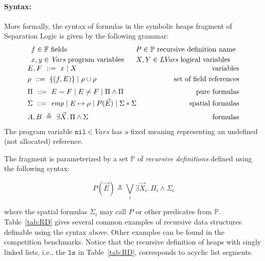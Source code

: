 \documentclass[twoside,11pt]{article}
\newcommand{\sep}{.\,}
\newcommand{\posep}{*}
\newcommand{\points}{\mapsto}
\newcommand{\vars}{\mathit{Vars}}
\newcommand{\lvars}{\mathit{LVars}}
\newcommand{\pfields}{\mathbb{F}}
\newcommand{\preds}{\mathbb{P}}
\newcommand{\nil}{\mathtt{nil}}
\newcommand{\ls}{\mathtt{ls}}
\begin{document}
\paragraph{Syntax:}
More formally, the syntax of formulas in the symbolic heaps fragment of Separation Logic
is given by the following grammar:
$$
\begin{array}{c}
\begin{array}{ll}
f \in \pfields \mbox{ fields} ~&~
P \in \preds \mbox{ recursive definition name}
\\[0.8mm]
x,y \in \vars \mbox{ program variables} ~&~
X,Y \in \lvars \mbox{ logical variables}
\end{array}
\\[2mm]
%
%
E,F\ ::=\ x \mid X 
\hfill \mbox{variables}
\\[1mm]
\rho\ ::=\ \{ (f,E) \} \mid \rho\cup\rho 
\hfill \mbox{set of field references}
\\[2mm]
%
\Pi\ ::=\ E = F \mid E \neq F \mid \Pi \land \Pi \hfill 
\mbox{pure formulas}\\[1mm]
%
\Sigma\ ::=\
\mathit{emp} \mid
E \points \rho \mid 
P(\vec{E}) \mid 
\Sigma \posep \Sigma 
%
\hspace{1cm}\hfill \mbox{spatial formulas}
\\[2mm]
A,B\ \triangleq\ \exists \vec{X}\sep \Pi\land\Sigma \hfill \mbox{formulas} %
\end{array}
$$
The program variable $\nil\in\vars$ has a fixed meaning representing an undefined (not allocated) reference.

The fragment is parameterized by a set $\preds$ of
\emph{recursive definitions} defined using the following syntax:

\begin{equation}\label{eq:RD}
P(\vec{E}) \triangleq \bigvee_i \exists \vec{X}_i\sep \Pi_i \land \Sigma_i
\end{equation}

\noindent where the spatial formulas $\Sigma_i$ may call $P$ or other predicates from $\preds$.
Table~\ref{tab:RD} gives several common examples of recursive data structures definable using the syntax above. Other examples can be found in the competition benchmarks.
%
Notice that the recursive definition of heaps with singly linked lists, i.e., the $\ls$ in Table~\ref{tab:RD},
corresponds to acyclic list segments.
\end{document}
